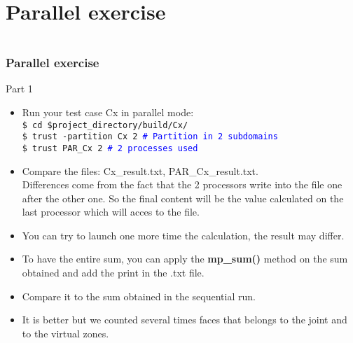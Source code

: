\documentclass[10pt, hyperref={unicode=true,pdfusetitle, bookmarks=true,bookmarksnumbered=false,bookmarksopen=false, breaklinks=false,pdfborder={0 0 1},backref=true,colorlinks=true,linkcolor=darkblue,pageanchor, urlcolor=darkblue}]{beamer}
\begin{document}
\section{{\bf{Parallel exercise}}}
\begin{frame}
\begin{columns}[c] 
\tableofcontents[sections={1-4},currentsection, currentsubsection]
\tableofcontents[sections={5-10},currentsection, currentsubsection]
\end{columns}
\end{frame}
\begin{frame}
\frametitle{Parallel exercise}

\begin{block}{Part 1}
\begin{itemize}
\item Run your test case Cx in parallel mode:\\
    \texttt{\$ cd \$project\_directory/build/Cx/}\\
\texttt{\$ trust -partition Cx 2 \textcolor{blue}{\# Partition in 2 subdomains}}\\
\texttt{\$ trust PAR\_Cx 2 \textcolor{blue}{\# 2 processes used}}

\item Compare the files: Cx\_result.txt, PAR\_Cx\_result.txt. \\

 Differences come from the fact that the 2 processors write into the file one after the other one.
So the final content will be the value calculated on the last processor which will acces to the file.

\item You can try to launch one more time the calculation, the result may differ.

\item To have the entire sum, you can apply the \textbf{mp\_sum()} method on the sum obtained and add the print in the .txt file.

\item Compare it to the sum obtained in the sequential run.

\item It is better but we counted several times faces that belongs to the joint and to the virtual zones.
\end{itemize}

\end{block}
\end{frame}
\end{document}
